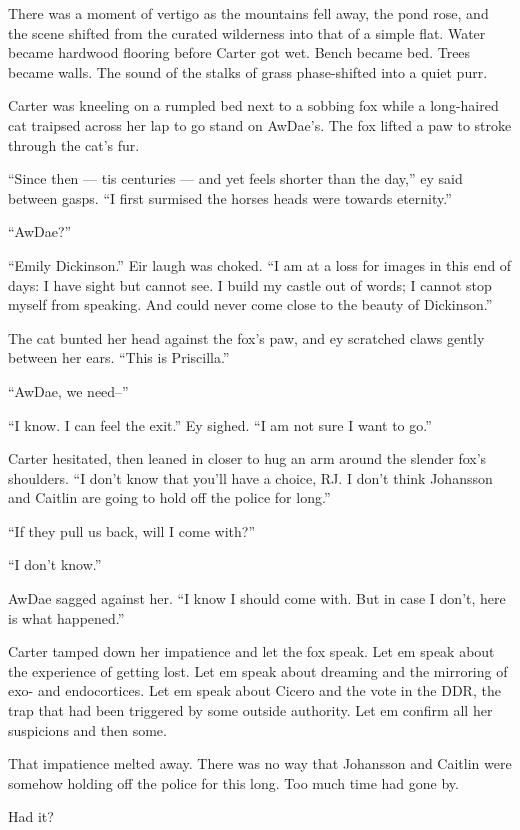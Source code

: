 There was a moment of vertigo as the mountains fell away, the pond rose, and the scene shifted from the curated wilderness into that of a simple flat. Water became hardwood flooring before Carter got wet. Bench became bed. Trees became walls. The sound of the stalks of grass phase-shifted into a quiet purr.

Carter was kneeling on a rumpled bed next to a sobbing fox while a long-haired cat traipsed across her lap to go stand on AwDae's. The fox lifted a paw to stroke through the cat's fur.

``Since then — tis centuries — and yet feels shorter than the day,'' ey said between gasps. ``I first surmised the horses heads were towards eternity.''

``AwDae?''

``Emily Dickinson.'' Eir laugh was choked. ``I am at a loss for images in this end of days: I have sight but cannot see. I build my castle out of words; I cannot stop myself from speaking. And could never come close to the beauty of Dickinson.''

The cat bunted her head against the fox's paw, and ey scratched claws gently between her ears. ``This is Priscilla.''

``AwDae, we need--''

``I know. I can feel the exit.'' Ey sighed. ``I am not sure I want to go.''

Carter hesitated, then leaned in closer to hug an arm around the slender fox's shoulders. ``I don't know that you'll have a choice, RJ. I don't think Johansson and Caitlin are going to hold off the police for long.''

``If they pull us back, will I come with?''

``I don't know.''

AwDae sagged against her. ``I know I should come with. But in case I don't, here is what happened.''

Carter tamped down her impatience and let the fox speak. Let em speak about the experience of getting lost. Let em speak about dreaming and the mirroring of exo- and endocortices. Let em speak about Cicero and the vote in the DDR, the trap that had been triggered by some outside authority. Let em confirm all her suspicions and then some.

That impatience melted away. There was no way that Johansson and Caitlin were somehow holding off the police for this long. Too much time had gone by.

Had it?

